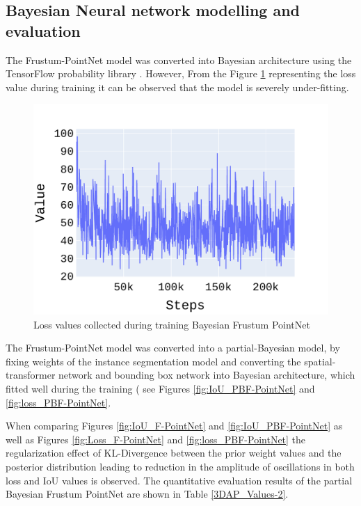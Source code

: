 \documentclass[10pt,twocolumn,letterpaper]{article}
\begin{document}
\subsection{Bayesian Neural network modelling and evaluation}
The Frustum-PointNet model was converted into Bayesian architecture using the TensorFlow probability library \cite{Tran2019}. However, From the Figure \ref{fig:Loss_BF-PointNet} representing the loss value during training it can be observed that the model is severely under-fitting.
\begin{figure}[!htbp]
	\centering
	\includegraphics[scale = 0.4]{./images/loss.pdf}
	\caption{Loss values collected during training Bayesian Frustum PointNet}
	\label{fig:Loss_BF-PointNet}
\end{figure}

The Frustum-PointNet model was converted into a partial-Bayesian model, by fixing weights of the instance segmentation model and converting the spatial-transformer network and bounding box network into Bayesian architecture, which fitted well during the training ( see Figures \ref{fig:IoU_PBF-PointNet} and \ref{fig:loss_PBF-PointNet}. 

When comparing Figures \ref{fig:IoU_F-PointNet} and \ref{fig:IoU_PBF-PointNet} as well as Figures \ref{fig:Loss_F-PointNet} and \ref{fig:loss_PBF-PointNet} the regularization effect of KL-Divergence between the prior weight values and the posterior distribution leading to reduction in the amplitude of oscillations in both loss and IoU values is observed. The quantitative evaluation results of the partial Bayesian Frustum PointNet are shown in Table \ref{3DAP_Values-2}.
\end{document}
